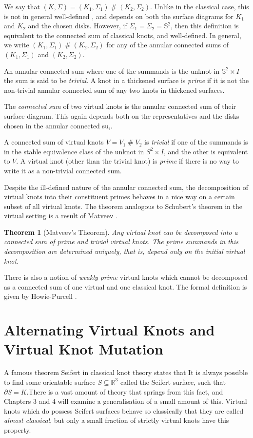\documentclass[12pt]{report}
\newcommand{\R}{\mathbb{R}}
\renewcommand{\S}{\mathbb{S}}
\newcommand{\hash}{\ensuremath{\mathbin{\#}}}
\newtheorem*{theorem}{Theorem}
\begin{document}
We say that $(K, \Sigma) = (K_{1}, \Sigma_{1}) \hash (K_{2}, \Sigma_{2})$. Unlike in the classical case, this is not in general well-defined \cite{virtual-knots-and-links}, and depends on both the surface diagrams for $K_{1}$ and $K_{2}$ and the chosen disks. However, if $\Sigma_{1} = \Sigma_{2} = \S^{2}$, then this definition is equivalent to the connected sum of classical knots, and well-defined. In general, we write $(K_{1}, \Sigma_{1}) \hash (K_{2}, \Sigma_{2})$ for any of the annular connected sums of $(K_{1}, \Sigma_{1})$ and $(K_{2}, \Sigma_{2})$.

An annular connected sum where one of the summands is the unknot in $\S^{2} \times I$ the sum is said to be \textit{trivial}. A knot in a thickened surface is \textit{prime} if it is not the non-trivial annular connected sum of any two knots in thickened surfaces.

The \textit{connected sum} of two virtual knots is the annular connected sum of their surface diagram. This again depends both on the representatives and the disks chosen in the annular connected su,.

A connected sum of virtual knots $V = V_{1} \hash V_{2}$ is \textit{trivial} if one of the summands is in the stable equivalence class of the unknot in $S^{2} \times I$, and the other is equivalent to $V$. A virtual knot (other than the trivial knot) is \textit{prime} if there is no way to write it as a non-trivial connected sum.

Despite the ill-defined nature of the annular connected sum, the decomposition of virtual knots into their constituent primes behaves in a nice way on a certain subset of all virtual knots. The theorem analogous to Schubert's theorem in the virtual setting is a result of Matveev \cite[Theorem 13]{roots-and-decompositions}.

\begin{theorem}[Matveev's Theorem]
Any virtual knot can be decomposed into a connected sum of prime and trivial virtual knots. The prime summands in this decomposition are determined uniquely, that is, depend only on the initial virtual knot.
\end{theorem}

There is also a notion of \textit{weakly prime} virtual knots which cannot be decomposed as a connected sum of one virtual and one classical knot. The formal definition is given by Howie-Purcell \cite{geometry-of-alternating-links-on-surfaces}.


\section{Alternating Virtual Knots and Virtual Knot Mutation}
A famous theorem Seifert in classical knot theory states that It is always possible to find some orientable surface $S \subseteq \R^{3}$ called the Seifert surface, such that $\partial S = K$.There is a vast amount of theory that springs from this fact, and Chapters 3 and 4 will examine a generalisation of a small amount of this. Virtual knots which do possess Seifert surfaces behave so classically that they are called \textit{almost classical}, but only a small fraction of strictly virtual knots have this property.
\end{document}
